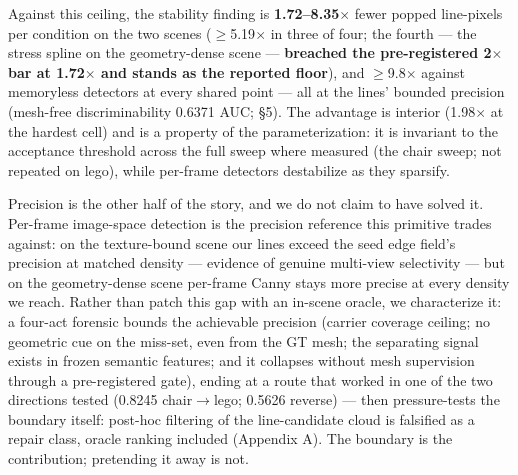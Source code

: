 Against this ceiling, the stability finding is \textbf{1.72--8.35$\times$} fewer popped line-pixels
per condition on the two scenes ($\geq$5.19$\times$ in three of four; the fourth --- the stress spline
on the geometry-dense scene --- \textbf{breached the pre-registered 2$\times$ bar at 1.72$\times$ and stands as
the reported floor}), and $\geq$9.8$\times$ against memoryless detectors at every shared point --- all
at the lines' bounded precision (mesh-free discriminability 0.6371 AUC; \S5). The advantage is interior (1.98$\times$ at the hardest cell) and
is a property of the parameterization: it is invariant to the acceptance threshold across
the full sweep where measured (the chair sweep; not repeated on lego), while per-frame
detectors destabilize as they sparsify.

Precision is the other half of the story, and we do not claim to have solved it. Per-frame
image-space detection is the precision reference this primitive trades against: on the
texture-bound scene our lines exceed the seed edge field's precision at matched density ---
evidence of genuine multi-view selectivity --- but on the geometry-dense scene per-frame
Canny stays more precise at every density we reach. Rather than patch this gap with an
in-scene oracle, we characterize it: a four-act forensic bounds the achievable precision
(carrier coverage ceiling; no geometric cue on the miss-set, even from the GT mesh; the
separating signal exists in frozen semantic features; and it collapses without mesh
supervision through a pre-registered gate), ending at a route that
worked in one of the two directions tested (0.8245 chair$\rightarrow$lego; 0.5626 reverse) --- then
pressure-tests the boundary itself: post-hoc filtering of the line-candidate cloud is
falsified as a repair class, oracle ranking included (Appendix A). The boundary is the contribution; pretending it away is not.


